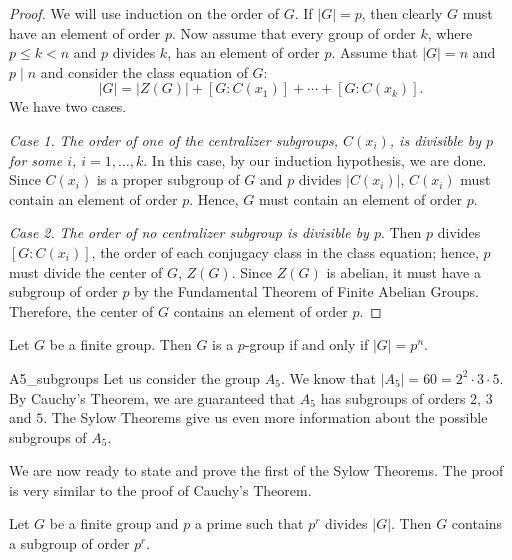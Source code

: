 \begin{proof}
We will use induction on the order of $G$.  If $|G|=p$, then clearly
$G$ must have an element of order $p$. Now assume that every group of
order $k$, where $p \leq k < n$ and $p$ divides $k$, has an element of
order $p$. Assume that $|G|= n$ and $p \mid n$ and consider the class
equation of $G$: 
\[
|G| = |Z(G)| + [G: C(x_1) ] + \cdots + [ G: C(x_k)].
\]
We have two cases.
 
 
{\em Case 1.}
{\em The order of one of the centralizer subgroups, $C(x_i)$, is
divisible by $p$ for some $i$, $i = 1, \ldots, k$}. 
In this case,  by our induction hypothesis, we are done. Since $C(x_i)$
is a proper subgroup of $G$ and $p$ divides $|C(x_i)|$, $C(x_i)$ must
contain an element of order $p$. Hence, $G$ must contain an element of
order $p$.  
 
 
{\em Case 2.}
{\em The order of no centralizer subgroup is divisible by
$p$}. 
Then $p$ divides $[G:C(x_i)]$, the order of each conjugacy class in
the class equation; hence, $p$ must divide the center of $G$, $Z(G)$.
Since $Z(G)$ is abelian, it must have a subgroup of order $p$ by the
Fundamental Theorem of Finite Abelian Groups. Therefore, the center of
$G$ contains an element of order $p$. 
\end{proof}
 
 
\begin{corollary}
Let $G$ be a finite group. Then $G$ is a $p$-group if and only if $|G|
= p^n$. 
\end{corollary}
 
 
\begin{example}{A5_subgroups}
Let us consider the group $A_5$.  We know that $|A_5| = 60 = 2^2 \cdot
3 \cdot 5$.  By Cauchy's Theorem, we are guaranteed that $A_5$ has
subgroups of orders $2$, $3$ and $5$. The Sylow Theorems give us even
more information about the possible subgroups of $A_5$.
\end{example}
 
 

 
 
We are now ready to state and prove the first of the Sylow Theorems.
The proof is very similar to the proof of Cauchy's Theorem.
 
 
\begin{theorem}
Let $G$ be a finite group and $p$ a prime such that $p^r$ divides
$|G|$. Then $G$ contains a subgroup of order $p^r$. 
\end{theorem}
 
